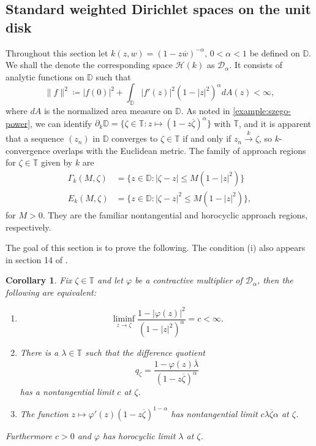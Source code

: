 \documentclass[leqno, final]{article}
\newtheorem{corollary}{Corollary}
\theoremstyle{definition}
\newcommand{\xto}[1]{\stackrel{#1}{\to}}
\newcommand{\disk}{\mathbb{D}}
\newcommand{\dirichlet}{\mathcal{D}}
\newcommand{\torus}{\mathbb{T}}
\newcommand{\Hilbert}{\mathcal{H}}
\newcommand{\rand}{\partial}
\renewcommand{\phi}{\varphi}
\begin{document}
\subsection{Standard weighted Dirichlet spaces on the unit disk}\label{section:dirichlet}
Throughout this section let $k(z,w) = (1-z\overline w)^{-\alpha},\,0<\alpha<1$ be defined
on $\disk$. We shall the denote the corresponding space $\Hilbert(k)$ as $\mathcal{D}_\alpha$.
It consists of analytic functions on $\disk$ such that \[
	\|f\|^2 \coloneq |f(0)|^2 + \int_\disk|f'(z)|^2(1-|z|^2)^\alpha dA(z) < \infty,
\]
where $dA$ is the normalized area measure on $\disk$. As noted in \cref{example:szego-power},
we can identify  $\rand_k\disk = \{\zeta\in\torus: z\mapsto (1-z\overline\zeta)^\alpha\}$ with $\torus$,
and it is apparent that a sequence $(z_n)$ in $\disk$ converges to
$\zeta\in\torus$ if and only if $z_n\xto{k}\zeta$, so $k$-convergence overlaps with
the Euclidean metric.
The family of approach regions for $\zeta\in\torus$ given by $k$ are \begin{align*}
	\Gamma_k(M, \zeta) &= \{z\in\disk:|\zeta-z|  \leq M(1-|z|^2)\} \\
	E_k(M,\zeta)       &= \{z\in\disk:|\zeta-z|^2\leq M(1-|z|^2)\},
\end{align*}
for $M>0$. They are the familiar nontangential and horocyclic approach regions, respectively.

The goal of this section is to prove the following. The condition (i) also appears in section
14 of \cite{hartz_free-outer}.
\begin{corollary}\label{corollary:dirichlet}
Fix $\zeta\in\torus$ and let $\phi$ be a contractive multiplier of $\dirichlet_\alpha$, then
the following are equivalent: \begin{enumerate}[label=(\roman*)]
\item \[
	\liminf_{z\to\zeta}\frac{1-|\phi(z)|^2}{(1-|z|^2)^\alpha} = c < \infty.
\]
\item There is a $\lambda\in\torus$ such that the difference quotient \[
	q_\zeta = \frac{1-\phi(z)\overline\lambda}{(1-z\overline\zeta)^\alpha}
\]
has a nontangential limit $c$ at $\zeta$.
\item The function $z\mapsto \phi'(z)(1-z\overline\zeta)^{1-\alpha}$ has nontangential
limit $c\lambda\overline\zeta\alpha$ at $\zeta$.
\end{enumerate}
Furthermore $c>0$ and $\phi$ has horocyclic limit $\lambda$ at $\zeta$.
\end{corollary}
\end{document}
